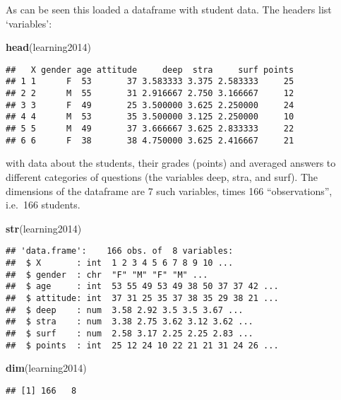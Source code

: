 \documentclass[
]{article}
\newenvironment{Shaded}{\begin{snugshade}}{\end{snugshade}}
\newcommand{\KeywordTok}[1]{\textcolor[rgb]{0.13,0.29,0.53}{\textbf{#1}}}
\newcommand{\NormalTok}[1]{#1}
\begin{document}
As can be seen this loaded a dataframe with student data. The headers
list `variables':

\begin{Shaded}
\begin{Highlighting}[]
\KeywordTok{head}\NormalTok{(learning2014)}
\end{Highlighting}
\end{Shaded}

\begin{verbatim}
##   X gender age attitude     deep  stra     surf points
## 1 1      F  53       37 3.583333 3.375 2.583333     25
## 2 2      M  55       31 2.916667 2.750 3.166667     12
## 3 3      F  49       25 3.500000 3.625 2.250000     24
## 4 4      M  53       35 3.500000 3.125 2.250000     10
## 5 5      M  49       37 3.666667 3.625 2.833333     22
## 6 6      F  38       38 4.750000 3.625 2.416667     21
\end{verbatim}

with data about the students, their grades (points) and averaged answers
to different categories of questions (the variables deep, stra, and
surf). The dimensions of the dataframe are 7 such variables, times 166
``observations'', i.e.~166 students.

\begin{Shaded}
\begin{Highlighting}[]
\KeywordTok{str}\NormalTok{(learning2014)}
\end{Highlighting}
\end{Shaded}

\begin{verbatim}
## 'data.frame':    166 obs. of  8 variables:
##  $ X       : int  1 2 3 4 5 6 7 8 9 10 ...
##  $ gender  : chr  "F" "M" "F" "M" ...
##  $ age     : int  53 55 49 53 49 38 50 37 37 42 ...
##  $ attitude: int  37 31 25 35 37 38 35 29 38 21 ...
##  $ deep    : num  3.58 2.92 3.5 3.5 3.67 ...
##  $ stra    : num  3.38 2.75 3.62 3.12 3.62 ...
##  $ surf    : num  2.58 3.17 2.25 2.25 2.83 ...
##  $ points  : int  25 12 24 10 22 21 21 31 24 26 ...
\end{verbatim}

\begin{Shaded}
\begin{Highlighting}[]
\KeywordTok{dim}\NormalTok{(learning2014)}
\end{Highlighting}
\end{Shaded}

\begin{verbatim}
## [1] 166   8
\end{verbatim}
\end{document}
